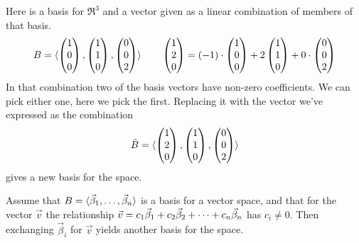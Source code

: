 \begin{example}
Here is a basis for $\Re^3$ and a vector given as a linear combination
of members of that basis.
\begin{equation*}
  B=\langle\begin{pmatrix} 1 \\ 0  \\ 0 \end{pmatrix},
              \begin{pmatrix} 1 \\ 1 \\ 0 \end{pmatrix},
              \begin{pmatrix} 0 \\ 0 \\ 2 \end{pmatrix}\rangle
  \qquad
  \begin{pmatrix} 1 \\ 2 \\ 0 \end{pmatrix}
  =(-1)\cdot\begin{pmatrix} 1 \\ 0  \\ 0 \end{pmatrix}
   +2\begin{pmatrix} 1 \\ 1 \\ 0 \end{pmatrix}
   +0\cdot\begin{pmatrix} 0 \\ 0 \\ 2 \end{pmatrix}
\end{equation*}
In that combination two of the basis vectors have non-zero coefficients.
We can pick either one, here we pick the first.
Replacing it with the vector we've expressed as the combination
\begin{equation*}
  \hat{B}=\langle\begin{pmatrix} 1 \\ 2  \\ 0 \end{pmatrix},
              \begin{pmatrix} 1 \\ 1 \\ 0 \end{pmatrix},
              \begin{pmatrix} 0 \\ 0 \\ 2 \end{pmatrix}\rangle
\end{equation*}
gives a new basis for the space.
\end{example}

\begin{lemma}
Assume that 
\( B=\langle\vec{\beta}_1,\dots,\vec{\beta}_n\rangle \) is a basis for a
vector space, and that for the vector \( \vec{v} \)
the relationship \( \vec{v}=c_1\vec{\beta}_1+c_2\vec{\beta}_2+\cdots +c_n\vec{\beta}_n \)
has \( c_i\neq 0 \).
Then exchanging \( \vec{\beta}_i \) for \( \vec{v} \) yields another
basis for the space.
\end{lemma}

